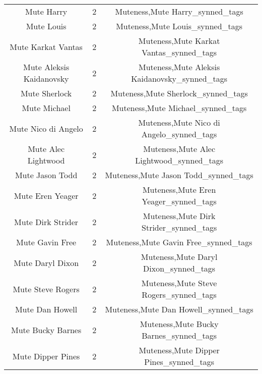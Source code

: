 \begin{table}[h!]
{\begin{tabular}{|c|c|c|}
                                        Mute Harry &          2 &                    Muteness,Mute Harry\_synned\_tags \\
                                        Mute Louis &          2 &                    Muteness,Mute Louis\_synned\_tags \\
                                Mute Karkat Vantas &          2 &            Muteness,Mute Karkat Vantas\_synned\_tags \\
                          Mute Aleksis Kaidanovsky &          2 &      Muteness,Mute Aleksis Kaidanovsky\_synned\_tags \\
                                     Mute Sherlock &          2 &                 Muteness,Mute Sherlock\_synned\_tags \\
                                      Mute Michael &          2 &                  Muteness,Mute Michael\_synned\_tags \\
                               Mute Nico di Angelo &          2 &           Muteness,Mute Nico di Angelo\_synned\_tags \\
                               Mute Alec Lightwood &          2 &           Muteness,Mute Alec Lightwood\_synned\_tags \\
                                   Mute Jason Todd &          2 &               Muteness,Mute Jason Todd\_synned\_tags \\
                                  Mute Eren Yeager &          2 &              Muteness,Mute Eren Yeager\_synned\_tags \\
                                 Mute Dirk Strider &          2 &             Muteness,Mute Dirk Strider\_synned\_tags \\
                                   Mute Gavin Free &          2 &               Muteness,Mute Gavin Free\_synned\_tags \\
                                  Mute Daryl Dixon &          2 &              Muteness,Mute Daryl Dixon\_synned\_tags \\
                                 Mute Steve Rogers &          2 &             Muteness,Mute Steve Rogers\_synned\_tags \\
                                   Mute Dan Howell &          2 &               Muteness,Mute Dan Howell\_synned\_tags \\
                                 Mute Bucky Barnes &          2 &             Muteness,Mute Bucky Barnes\_synned\_tags \\
                                 Mute Dipper Pines &          2 &             Muteness,Mute Dipper Pines\_synned\_tags \\

\end{tabular}}
\end{table}

